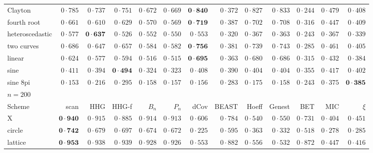 \begin{table}
{\begin{tabular}{lrrrrrrrrrrrr}
Clayton & $0{\cdot}785$ & $0{\cdot}737$ & $0{\cdot}751$ & $0{\cdot}672$ & $0{\cdot}669$ & $\mathbf{0{\cdot}840}$ & $0{\cdot}372$ & $0{\cdot}827$ & $0{\cdot}833$ & $0{\cdot}244$ & $0{\cdot}479$ & $0{\cdot}408$ \\
fourth root & $0{\cdot}661$ & $0{\cdot}610$ & $0{\cdot}629$ & $0{\cdot}570$ & $0{\cdot}569$ & $\mathbf{0{\cdot}719}$ & $0{\cdot}387$ & $0{\cdot}702$ & $0{\cdot}708$ & $0{\cdot}316$ & $0{\cdot}447$ & $0{\cdot}409$ \\
heteroscedastic & $0{\cdot}577$ & $\mathbf{0{\cdot}637}$ & $0{\cdot}526$ & $0{\cdot}552$ & $0{\cdot}550$ & $0{\cdot}553$ & $0{\cdot}320$ & $0{\cdot}367$ & $0{\cdot}363$ & $0{\cdot}243$ & $0{\cdot}367$ & $0{\cdot}339$ \\
two curves & $0{\cdot}686$ & $0{\cdot}647$ & $0{\cdot}657$ & $0{\cdot}584$ & $0{\cdot}582$ & $\mathbf{0{\cdot}756}$ & $0{\cdot}381$ & $0{\cdot}739$ & $0{\cdot}743$ & $0{\cdot}285$ & $0{\cdot}461$ & $0{\cdot}405$ \\
linear & $0{\cdot}624$ & $0{\cdot}577$ & $0{\cdot}594$ & $0{\cdot}516$ & $0{\cdot}515$ & $\mathbf{0{\cdot}695}$ & $0{\cdot}363$ & $0{\cdot}680$ & $0{\cdot}686$ & $0{\cdot}315$ & $0{\cdot}432$ & $0{\cdot}384$ \\
sine & $0{\cdot}411$ & $0{\cdot}394$ & $\mathbf{0{\cdot}494}$ & $0{\cdot}324$ & $0{\cdot}323$ & $0{\cdot}408$ & $0{\cdot}390$ & $0{\cdot}404$ & $0{\cdot}404$ & $0{\cdot}355$ & $0{\cdot}417$ & $0{\cdot}402$ \\
sine 8pi & $0{\cdot}153$ & $0{\cdot}216$ & $0{\cdot}295$ & $0{\cdot}158$ & $0{\cdot}157$ & $0{\cdot}156$ & $0{\cdot}283$ & $0{\cdot}175$ & $0{\cdot}158$ & $0{\cdot}243$ & $0{\cdot}375$ & $\mathbf{0{\cdot}385}$ \\
\hline
\multicolumn{13}{l}{$n = 200$} \\
Scheme & scan & HHG & HHG-f & $B_n$ & $P_n$ & dCov & BEAST & Hoeff & Genest & BET & MIC & $\xi$ \\ \hline
X & $\mathbf{0{\cdot}940}$ & $0{\cdot}915$ & $0{\cdot}885$ & $0{\cdot}914$ & $0{\cdot}913$ & $0{\cdot}606$ & $0{\cdot}784$ & $0{\cdot}540$ & $0{\cdot}550$ & $0{\cdot}731$ & $0{\cdot}404$ & $0{\cdot}451$ \\
circle & $\mathbf{0{\cdot}742}$ & $0{\cdot}679$ & $0{\cdot}697$ & $0{\cdot}674$ & $0{\cdot}672$ & $0{\cdot}225$ & $0{\cdot}595$ & $0{\cdot}363$ & $0{\cdot}332$ & $0{\cdot}518$ & $0{\cdot}278$ & $0{\cdot}285$ \\
lattice & $\mathbf{0{\cdot}953}$ & $0{\cdot}938$ & $0{\cdot}939$ & $0{\cdot}928$ & $0{\cdot}926$ & $0{\cdot}553$ & $0{\cdot}882$ & $0{\cdot}556$ & $0{\cdot}532$ & $0{\cdot}872$ & $0{\cdot}447$ & $0{\cdot}416$ \\

\end{tabular}}
\end{table}
